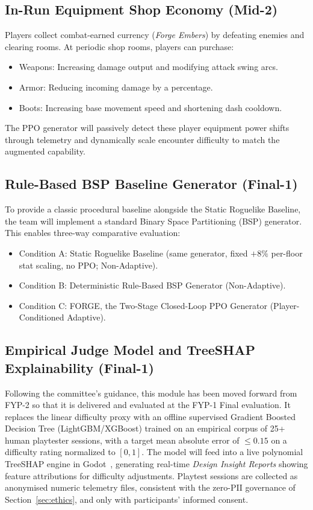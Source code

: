 \subsection{In-Run Equipment Shop Economy (Mid-2)}
Players collect combat-earned currency (\textit{Forge Embers}) by defeating enemies and clearing rooms. At periodic shop rooms, players can purchase:
\begin{itemize}
    \item Weapons: Increasing damage output and modifying attack swing arcs.
    \item Armor: Reducing incoming damage by a percentage.
    \item Boots: Increasing base movement speed and shortening dash cooldown.
\end{itemize}
The PPO generator will passively detect these player equipment power shifts through telemetry and dynamically scale encounter difficulty to match the augmented capability.

\subsection{Rule-Based BSP Baseline Generator (Final-1)}
To provide a classic procedural baseline alongside the Static Roguelike Baseline, the team will implement a standard Binary Space Partitioning (BSP) generator. This enables three-way comparative evaluation:
\begin{itemize}
    \item Condition A: Static Roguelike Baseline (same generator, fixed $+8\%$ per-floor stat scaling, no PPO; Non-Adaptive).
    \item Condition B: Deterministic Rule-Based BSP Generator (Non-Adaptive).
    \item Condition C: FORGE, the Two-Stage Closed-Loop PPO Generator (Player-Conditioned Adaptive).
\end{itemize}

\subsection{Empirical Judge Model and TreeSHAP Explainability (Final-1)}
Following the committee's guidance, this module has been moved forward from FYP-2 so that it is delivered and evaluated at the FYP-1 Final evaluation. It replaces the linear difficulty proxy with an offline supervised Gradient Boosted Decision Tree (LightGBM/XGBoost) trained on an empirical corpus of 25+ human playtester sessions, with a target mean absolute error of $\le 0.15$ on a difficulty rating normalized to $[0,1]$. The model will feed into a live polynomial TreeSHAP engine in Godot~\cite{lundberg2017unified, lundberg2020local}, generating real-time \textit{Design Insight Reports} showing feature attributions for difficulty adjustments. Playtest sessions are collected as anonymised numeric telemetry files, consistent with the zero-PII governance of Section~\ref{sec:ethics}, and only with participants' informed consent.

